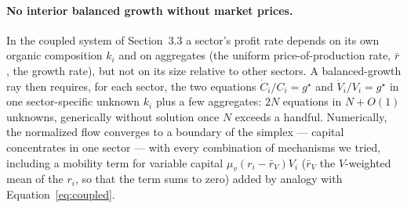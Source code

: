 \documentclass[11pt]{article}
\begin{document}
\paragraph{No interior balanced growth without market prices.} In the
coupled system of Section~3.3 a sector's profit rate depends on its own
organic composition $k_i$ and on aggregates (the uniform price-of-production
rate, $\bar r$, the growth rate), but not on its size relative to other
sectors. A balanced-growth ray then requires, for each sector, the two
equations $\dot C_i/C_i=g^\star$ and $\dot V_i/V_i=g^\star$ in one
sector-specific unknown $k_i$ plus a few aggregates: $2N$ equations in
$N+O(1)$ unknowns, generically without solution once $N$ exceeds a
handful. Numerically, the normalized flow converges to a boundary of the
simplex --- capital concentrates in one sector --- with every combination
of mechanisms we tried, including a mobility term for variable capital
$\mu_v(r_i-\bar r_V)V_i$ ($\bar r_V$ the $V$-weighted mean of the $r_i$,
so that the term sums to zero) added by analogy with
Equation~\eqref{eq:coupled}.
\end{document}
